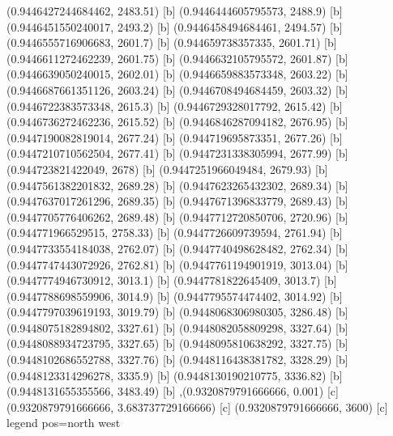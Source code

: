 {{{(0.9446427244684462, 2483.51) [b] 
(0.9446444605795573, 2488.9) [b] 
(0.9446451550240017, 2493.2) [b] 
(0.9446458494684461, 2494.57) [b] 
(0.9446555716906683, 2601.7) [b] 
(0.944659738357335, 2601.71) [b] 
(0.9446611272462239, 2601.75) [b] 
(0.9446632105795572, 2601.87) [b] 
(0.9446639050240015, 2602.01) [b] 
(0.9446659883573348, 2603.22) [b] 
(0.9446687661351126, 2603.24) [b] 
(0.9446708494684459, 2603.32) [b] 
(0.9446722383573348, 2615.3) [b] 
(0.9446729328017792, 2615.42) [b] 
(0.9446736272462236, 2615.52) [b] 
(0.9446846287094182, 2676.95) [b] 
(0.9447190082819014, 2677.24) [b] 
(0.944719695873351, 2677.26) [b] 
(0.9447210710562504, 2677.41) [b] 
(0.9447231338305994, 2677.99) [b] 
(0.944723821422049, 2678) [b] 
(0.9447251966049484, 2679.93) [b] 
(0.9447561382201832, 2689.28) [b] 
(0.9447623265432302, 2689.34) [b] 
(0.9447637017261296, 2689.35) [b] 
(0.9447671396833779, 2689.43) [b] 
(0.9447705776406262, 2689.48) [b] 
(0.9447712720850706, 2720.96) [b] 
(0.944771966529515, 2758.33) [b] 
(0.9447726609739594, 2761.94) [b] 
(0.9447733554184038, 2762.07) [b] 
(0.9447740498628482, 2762.34) [b] 
(0.9447747443072926, 2762.81) [b] 
(0.9447761194901919, 3013.04) [b] 
(0.9447774946730912, 3013.1) [b] 
(0.9447781822645409, 3013.7) [b] 
(0.9447788698559906, 3014.9) [b] 
(0.9447795574474402, 3014.92) [b] 
(0.9447797039619193, 3019.79) [b] 
(0.9448068306980305, 3286.48) [b] 
(0.9448075182894802, 3327.61) [b] 
(0.9448082058809298, 3327.64) [b] 
(0.9448088934723795, 3327.65) [b] 
(0.9448095810638292, 3327.75) [b] 
(0.9448102686552788, 3327.76) [b] 
(0.9448116438381782, 3328.29) [b] 
(0.9448123314296278, 3335.9) [b] 
(0.9448130190210775, 3336.82) [b] 
(0.9448131655355566, 3483.49) [b] 
},{(0.9320879791666666, 0.001) [c] 
(0.9320879791666666, 3.683737729166666) [c] 
(0.9320879791666666, 3600) [c] 
}}}{legend pos=north west}